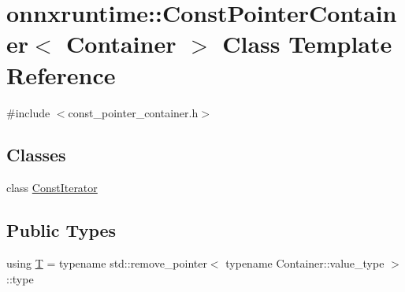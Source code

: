 \hypertarget{classonnxruntime_1_1ConstPointerContainer}{}\section{onnxruntime\+:\+:Const\+Pointer\+Container$<$ Container $>$ Class Template Reference}
\label{classonnxruntime_1_1ConstPointerContainer}


{\ttfamily \#include $<$const\+\_\+pointer\+\_\+container.\+h$>$}

\subsection*{Classes}
\begin{DoxyCompactItemize}
\item 
class \mbox{\hyperlink{classonnxruntime_1_1ConstPointerContainer_1_1ConstIterator}{Const\+Iterator}}
\end{DoxyCompactItemize}
\subsection*{Public Types}
\begin{DoxyCompactItemize}
\item 
using \mbox{\hyperlink{classonnxruntime_1_1ConstPointerContainer_ae78936c3220735b7dba8004b7d5c9888}{T}} = typename std\+::remove\+\_\+pointer$<$ typename Container\+::value\+\_\+type $>$\+::type
\end{DoxyCompactItemize}
